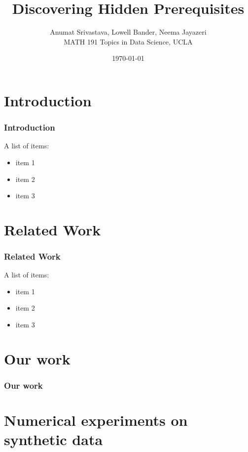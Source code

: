 \documentclass{beamer}
\title{Discovering Hidden Prerequisites}
\author{ Anumat Srivastava, Lowell Bander, Neema Jayazeri\\
\vspace{5mm}
MATH 191 Topics in Data Science, UCLA}
\date{ \today}
\begin{document}
\newtheorem{theo}{Theorem}
\newtheorem{lem}{Lemma}
\newtheorem{defin}{Definition}
\newtheorem{prop}{Proposition}
\newtheorem{ex}{Example}
\newtheorem{alg}{Algorithm}
\newtheorem{cor}{Corollary}
\newtheorem{case}{Case}


\begin{frame}
  \titlepage
\end{frame}



\section{Introduction}

\begin{frame}
     \frametitle{Introduction}
A list of items:
\begin{itemize}
\item item 1
\item  item 2
\item  item 3
\end{itemize}
\end{frame}



\section{Related Work}

\begin{frame}
     \frametitle{Related Work}
A list of items:
\begin{itemize}
\item item 1
\item  item 2
\item  item 3
\end{itemize}
\end{frame}




 


\section{Our work}    \label{sec:ourWork}

\begin{frame}
     \frametitle{ Our work}
\end{frame}



\section{Numerical experiments on synthetic data}  \label{sec:NumExpSyn}
\end{document}

